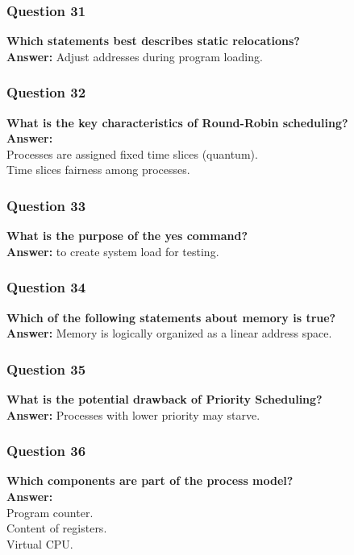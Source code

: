 \documentclass{article}
\begin{document}
\subsubsection*{Question 31}
\textbf{Which statements best describes static relocations?} \\
\textbf{Answer:} Adjust addresses during program loading.

\subsubsection*{Question 32}
\textbf{What is the key characteristics of Round-Robin scheduling?} \\
\textbf{Answer:} \\
Processes are assigned fixed time slices (quantum). \\
Time slices fairness among processes.

\subsubsection*{Question 33}
\textbf{What is the purpose of the yes command?} \\
\textbf{Answer:} to create system load for testing.

\subsubsection*{Question 34}
\textbf{Which of the following statements about memory is true?} \\
\textbf{Answer:} Memory is logically organized as a linear address space.

\subsubsection*{Question 35}
\textbf{What is the potential drawback of Priority Scheduling?} \\
\textbf{Answer:} Processes with lower priority may starve.

\subsubsection*{Question 36}
\textbf{Which components are part of the process model?} \\
\textbf{Answer:} \\
Program counter. \\
Content of registers. \\
Virtual CPU.
\end{document}
